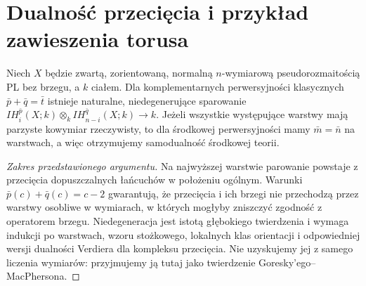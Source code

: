 \section{Dualność przecięcia i przykład zawieszenia torusa}
\begin{twierdzenie}
\label{thm:ih-duality-xiii}
Niech $X$ będzie zwartą, zorientowaną, normalną
$n$-wymiarową pseudorozmaitością PL bez brzegu,
a $k$ ciałem. Dla komplementarnych perwersyjności
klasycznych $\bar p+\bar q=\bar t$ istnieje
naturalne, niedegenerujące sparowanie
$IH_i^{\bar p}(X;k)\otimes_k
 IH_{n-i}^{\bar q}(X;k)\to k$.
Jeżeli wszystkie występujące warstwy mają parzyste
kowymiar rzeczywisty, to dla środkowej
perwersyjności mamy $\bar m=\bar n$ na warstwach,
a więc otrzymujemy samodualność środkowej teorii.
\end{twierdzenie}
\begin{proof}[Zakres przedstawionego argumentu]
Na najwyższej warstwie parowanie powstaje z przecięcia
dopuszczalnych łańcuchów w położeniu ogólnym.
Warunki $\bar p(c)+\bar q(c)=c-2$ gwarantują,
że przecięcia i ich brzegi nie przechodzą przez
warstwy osobliwe w wymiarach, w których mogłyby
zniszczyć zgodność z operatorem brzegu.
Niedegeneracja jest istotą głębokiego twierdzenia
i wymaga indukcji po warstwach, wzoru stożkowego,
lokalnych klas orientacji i odpowiedniej wersji
dualności Verdiera dla kompleksu przecięcia.
Nie uzyskujemy jej z samego liczenia wymiarów:
przyjmujemy ją tutaj jako twierdzenie Goresky'ego--MacPhersona.
\end{proof}

